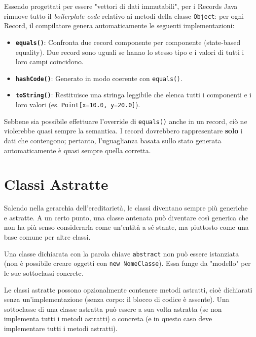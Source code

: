 Essendo progettati per essere "vettori di dati immutabili", per i Records Java rimuove tutto il \textit{boilerplate code} relativo ai metodi della classe \texttt{Object}: per ogni Record, il compilatore genera automaticamente le seguenti implementazioni:
    \begin{itemize}
        \item \textbf{\texttt{equals()}}: Confronta due record componente per componente (state-based equality). Due record sono uguali se hanno lo stesso tipo e i valori di tutti i loro campi coincidono.
        \item \textbf{\texttt{hashCode()}}: Generato in modo coerente con \texttt{equals()}.
        \item \textbf{\texttt{toString()}}: Restituisce una stringa leggibile che elenca tutti i componenti e i loro valori (es. \texttt{Point[x=10.0, y=20.0]}).
    \end{itemize}

\begin{observation}
    Sebbene sia possibile effettuare l'override di \texttt{equals()} anche in un record, ciò ne violerebbe quasi sempre la semantica. I record dovrebbero rappresentare \textbf{solo} i dati che contengono; pertanto, l'uguaglianza basata sullo stato generata automaticamente è quasi sempre quella corretta.
\end{observation}

\section{Classi Astratte}

Salendo nella gerarchia dell'ereditarietà, le classi diventano sempre più generiche e astratte. A un certo punto, una classe antenata può diventare così generica che non ha più senso considerarla come un'entità a sé stante, ma piuttosto come una base comune per altre classi.

Una classe dichiarata con la parola chiave \texttt{abstract} non può essere istanziata (non è possibile creare oggetti con \texttt{new NomeClasse}). Essa funge da "modello" per le sue sottoclassi concrete.

Le classi astratte possono opzionalmente contenere metodi astratti, cioè dichiarati senza un'implementazione (senza corpo: il blocco di codice è assente). Una sottoclasse di una classe astratta può essere a sua volta astratta (se non implementa tutti i metodi astratti) o concreta (e in questo caso deve implementare tutti i metodi astratti).

